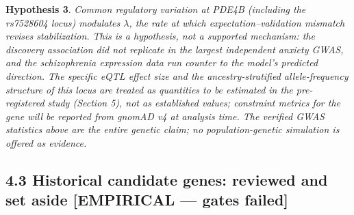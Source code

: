 \documentclass[
]{article}
\begin{document}
\textbf{Hypothesis 3}. \emph{Common regulatory variation at PDE4B
(including the rs7528604 locus) modulates \(\lambda\), the rate at which
expectation--validation mismatch revises stabilization. This is a
hypothesis, not a supported mechanism: the discovery association did not
replicate in the largest independent anxiety GWAS, and the schizophrenia
expression data run counter to the model's predicted direction. The
specific eQTL effect size and the ancestry-stratified allele-frequency
structure of this locus are treated as quantities to be estimated in the
pre-registered study (Section 5), not as established values; constraint
metrics for the gene will be reported from gnomAD v4 at analysis time.
The verified GWAS statistics above are the entire genetic claim; no
population-genetic simulation is offered as evidence.}

\subsection{4.3 Historical candidate genes: reviewed and set aside
{[}EMPIRICAL --- gates
failed{]}}\label{historical-candidate-genes-reviewed-and-set-aside-empirical-gates-failed}
\end{document}
